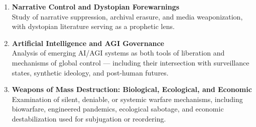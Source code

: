 \begin{enumerate}[label=\textbf{\arabic*.}, leftmargin=*]
	\item \textbf{Narrative Control and Dystopian Forewarnings} \\
	Study of narrative suppression, archival erasure, and media weaponization, with dystopian literature serving as a prophetic lens.
	
	\item \textbf{Artificial Intelligence and AGI Governance} \\
	Analysis of emerging AI/AGI systems as both tools of liberation and mechanisms of global control --- including their intersection with surveillance states, synthetic ideology, and post-human futures.
	
	\item \textbf{Weapons of Mass Destruction: Biological, Ecological, and Economic} \\
	Examination of silent, deniable, or systemic warfare mechanisms, including biowarfare, engineered pandemics, ecological sabotage, and economic destabilization used for subjugation or reordering.
\end{enumerate}

